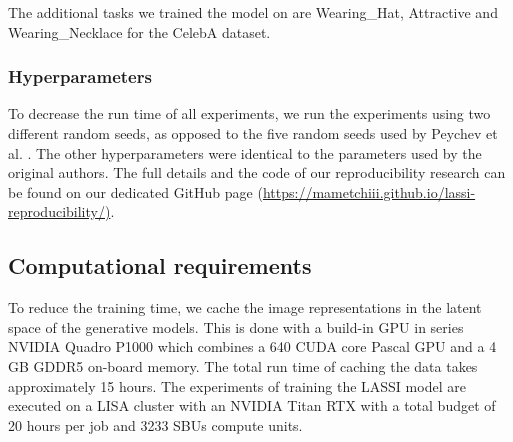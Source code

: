 The additional tasks we trained the model on are Wearing\_Hat, Attractive and Wearing\_Necklace for the CelebA dataset.


\subsubsection{Hyperparameters} To decrease the run time of all experiments, we run the experiments using two different random seeds, as opposed to the five random seeds used by Peychev et al. \cite{peychev2022latent}. The other hyperparameters were identical to the parameters used by the original authors. The full details and the code of our reproducibility research can be found on our dedicated GitHub page (\url{https://mametchiii.github.io/lassi-reproducibility/)}.







\subsection{Computational requirements}
To reduce the training time, we cache the image representations in the latent space of the generative models. This is done with a build-in GPU in series NVIDIA Quadro P1000 which combines a 640 CUDA core Pascal GPU and a 4 GB GDDR5 on-board memory. The total run time of caching the data takes approximately 15 hours. The experiments of training the LASSI model are executed on a LISA cluster with an NVIDIA Titan RTX with a total budget of 20 hours per job and 3233 SBUs compute units. 

